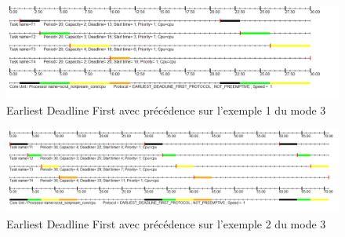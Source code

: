 {{    \begin{figure}[H]
      \centering
      \includegraphics[width=16cm]{
        img/mode3/edf/edf_s1.png
      }
      \caption{Earliest Deadline First avec précédence sur l'exemple 1 du mode 3}
    \end{figure}

    \begin{figure}[H]
      \centering
      \includegraphics[width=16cm]{
        img/mode3/edf/edf_s2.png
      }
      \caption{Earliest Deadline First avec précédence sur l'exemple 2 du mode 3}
    \end{figure}

  }
 }

\newpage
